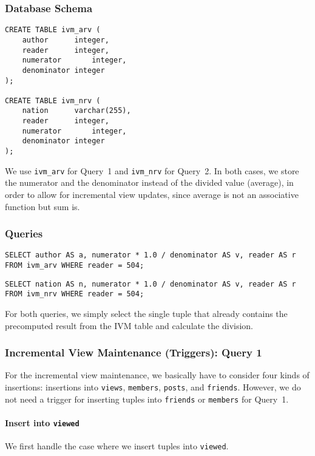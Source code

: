 \documentclass[12pt]{article}
\begin{document}
\subsubsection{Database Schema}
\begin{lstlisting}
CREATE TABLE ivm_arv (
	author		integer,
	reader		integer,
	numerator		integer,
	denominator	integer
);

CREATE TABLE ivm_nrv (
	nation		varchar(255),
	reader		integer,
	numerator		integer,
	denominator	integer
);
\end{lstlisting}

\noindent We use \lstinline{ivm_arv} for Query~1 and \lstinline{ivm_nrv} for Query~2. In both cases, we store the numerator and the denominator instead of the divided value (average), in order to allow for incremental view updates, since average is not an associative function but sum is.

\subsubsection{Queries}

\begin{lstlisting}
SELECT author AS a, numerator * 1.0 / denominator AS v, reader AS r FROM ivm_arv WHERE reader = 504;
\end{lstlisting}

\begin{lstlisting}
SELECT nation AS n, numerator * 1.0 / denominator AS v, reader AS r FROM ivm_nrv WHERE reader = 504;
\end{lstlisting}

\noindent For both queries, we simply select the single tuple that already contains the precomputed result from the IVM table and calculate the division.

\subsubsection{Incremental View Maintenance (Triggers): Query 1}
For the incremental view maintenance, we basically have to consider four kinds of insertions: insertions into \lstinline{views}, \lstinline{members}, \lstinline{posts}, and \lstinline{friends}. However, we do not need a trigger for inserting tuples into \lstinline{friends} or \lstinline{members} for Query~1.

\paragraph{Insert into \lstinline{viewed}}
We first handle the case where we insert tuples into \lstinline{viewed}.
\end{document}

